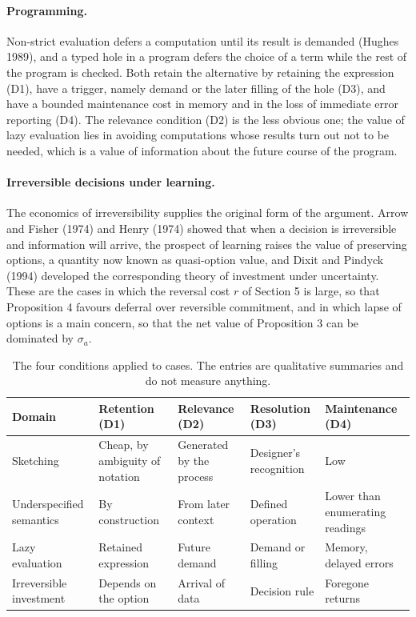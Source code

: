 \documentclass[11pt]{article}
\theoremstyle{remark}
\begin{document}
\paragraph{Programming.} Non-strict evaluation defers a computation until its result is demanded (Hughes 1989), and a typed hole in a program defers the choice of a term while the rest of the program is checked. Both retain the alternative by retaining the expression (D1), have a trigger, namely demand or the later filling of the hole (D3), and have a bounded maintenance cost in memory and in the loss of immediate error reporting (D4). The relevance condition (D2) is the less obvious one; the value of lazy evaluation lies in avoiding computations whose results turn out not to be needed, which is a value of information about the future course of the program.

\paragraph{Irreversible decisions under learning.} The economics of irreversibility supplies the original form of the argument. Arrow and Fisher (1974) and Henry (1974) showed that when a decision is irreversible and information will arrive, the prospect of learning raises the value of preserving options, a quantity now known as quasi-option value, and Dixit and Pindyck (1994) developed the corresponding theory of investment under uncertainty. These are the cases in which the reversal cost $r$ of Section 5 is large, so that Proposition 4 favours deferral over reversible commitment, and in which lapse of options is a main concern, so that the net value of Proposition 3 can be dominated by $\sigma_a$.

\begin{table}[ht]
\centering
\small
\begin{tabular}{p{2.8cm}p{2.6cm}p{2.6cm}p{2.6cm}p{2.2cm}}
\toprule
Domain & Retention (D1) & Relevance (D2) & Resolution (D3) & Maintenance (D4) \\
\midrule
Sketching & Cheap, by ambiguity of notation & Generated by the process & Designer's recognition & Low \\
Underspecified semantics & By construction & From later context & Defined operation & Lower than enumerating readings \\
Lazy evaluation & Retained expression & Future demand & Demand or filling & Memory, delayed errors \\
Irreversible investment & Depends on the option & Arrival of data & Decision rule & Foregone returns \\
\bottomrule
\end{tabular}
\caption{The four conditions applied to cases. The entries are qualitative summaries and do not measure anything.}
\end{table}
\end{document}

